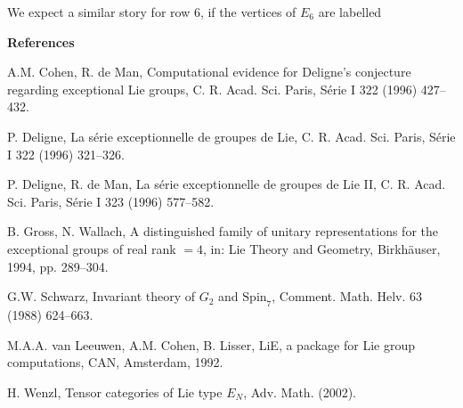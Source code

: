 \documentclass[11pt,a4paper]{article}
\begin{document}
We expect a similar story for row $6$, if the vertices of $E_{6}$ are labelled
\begin{center}
\end{center}

\bigskip
\noindent\textbf{References}

\begin{enumerate}[label={[\arabic*]}]
\item A.M. Cohen, R. de Man, Computational evidence for Deligne's conjecture regarding exceptional Lie groups, C. R. Acad. Sci. Paris, S\'{e}rie I 322 (1996) 427--432.
\item P. Deligne, La s\'{e}rie exceptionnelle de groupes de Lie, C. R. Acad. Sci. Paris, S\'{e}rie I 322 (1996) 321--326.
\item P. Deligne, R. de Man, La s\'{e}rie exceptionnelle de groupes de Lie II, C. R. Acad. Sci. Paris, S\'{e}rie I 323 (1996) 577--582.
\item B. Gross, N. Wallach, A distinguished family of unitary representations for the exceptional groups of real rank $= 4$, in: Lie Theory and Geometry, Birkh\"{a}user, 1994, pp. 289--304.
\item G.W. Schwarz, Invariant theory of $G_{2}$ and $\mathrm{Spin}_{7}$, Comment. Math. Helv. 63 (1988) 624--663.
\item M.A.A. van Leeuwen, A.M. Cohen, B. Lisser, LiE, a package for Lie group computations, CAN, Amsterdam, 1992.
\item H. Wenzl, Tensor categories of Lie type $E_{N}$, Adv. Math. (2002).
\end{enumerate}
\end{document}
